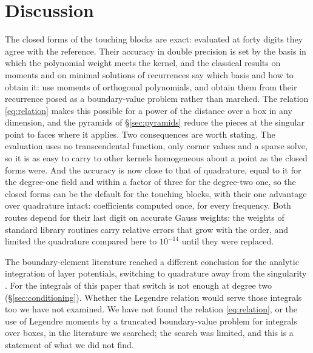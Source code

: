 \documentclass[11pt,a4paper]{article}
\begin{document}
\section{Discussion}\label{sec:discussion}

The closed forms of the touching blocks are exact: evaluated at forty digits they agree with the
reference. Their accuracy in double precision is set by the basis in which the polynomial weight meets the
kernel, and the classical results on moments \citep{Gautschi1970} and on minimal solutions of recurrences
\citep{Gautschi1967,Olver1967} say which basis and how to obtain it: use moments of orthogonal polynomials, and obtain them from their recurrence posed as a
boundary-value problem rather than marched. The relation \eqref{eq:relation} makes this possible for a
power of the distance over a box in any dimension, and the pyramids of \S\ref{sec:pyramids} reduce the
pieces at the singular point to faces where it applies. Two consequences are worth stating. The evaluation
uses no transcendental function, only corner values and a sparse solve, so it is as easy to carry to
other kernels homogeneous about a point as the closed forms were. And the accuracy is now close to that of
quadrature, equal to it for the degree-one field and within a factor of three for the degree-two one, so the
closed forms can be the default for the touching blocks, with their one advantage over quadrature intact:
coefficients computed once, for every frequency. Both routes depend for their last digit on accurate Gauss
weights: the weights of standard library routines carry relative errors that grow with the order, and
limited the quadrature compared here to $10^{-14}$ until they were replaced.

The boundary-element literature reached a different conclusion for the analytic integration of layer
potentials, switching to quadrature away from the singularity
\citep{KanekoGumerovDuraiswami2024,GumerovKanekoDuraiswami2024}. For the integrals of this paper that
switch is not enough at degree two (\S\ref{sec:conditioning}). Whether the Legendre relation would serve
those integrals too we have not examined. We have not found the relation \eqref{eq:relation}, or the
use of Legendre moments by a truncated boundary-value problem for integrals over boxes, in the literature
we searched; the search was limited, and this is a statement of what we did not find.
\end{document}
